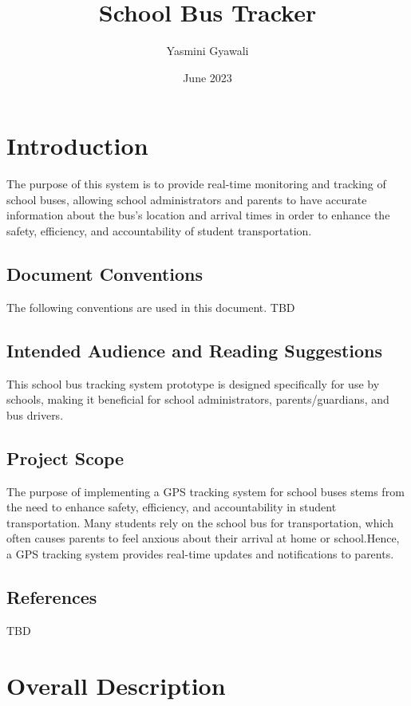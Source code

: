 \documentclass{article}
\title{School Bus Tracker}
\author{Yasmini Gyawali}
\date{June 2023}
\begin{document}
\maketitle

\section{Introduction}
The purpose of this system is to provide real-time monitoring and tracking of school buses, allowing school administrators and parents to have accurate information about the bus's location and arrival times in order to enhance the safety, efficiency, and accountability of student transportation.

\subsection{Document Conventions}
The following conventions are used in this document.
{TBD}

\subsection{Intended Audience and Reading Suggestions}
This school bus tracking system prototype is designed specifically for use by schools, making it beneficial for school administrators, parents/guardians, and bus drivers.

\subsection{Project Scope}
The purpose of implementing a GPS tracking system for school buses stems from the need to enhance safety, efficiency, and accountability in student transportation. Many students rely on the school bus for transportation, which often causes parents to feel anxious about their arrival at home or school.Hence, a GPS tracking system provides real-time updates and notifications to parents.

\subsection{References}
{TBD}

\section{Overall Description}
\end{document}
